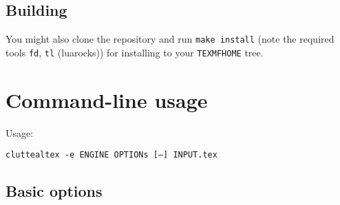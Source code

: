 \documentclass[a4paper]{report}
\newcommand\metavar[1]{\textnormal{\textsf{#1}}}
\begin{document}
\subsection{Building}
You might also clone the repository and run \texttt{make install} (note the
required tools \texttt{fd}, \texttt{tl} (luarocks)) for installing to your
\texttt{TEXMFHOME} tree.

\section{Command-line usage}
Usage:
\begin{center}
  \texttt{cluttealtex -e \metavar{ENGINE} \metavar{OPTIONs} [--] \metavar{INPUT}.tex}
\end{center}

\subsection{Basic options}
\end{document}
